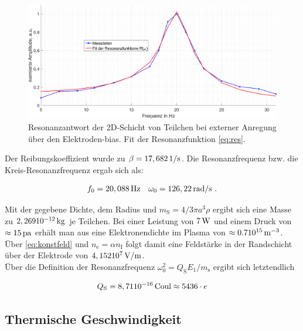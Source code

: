 \documentclass[numbers=noenddot,a4paper,notitlepage,twoside,BCOR15mm]{scrartcl}
\newcommand{\tenpo}[1]{ 10^{#1}}
\newcommand{\ix}[1]{_\text{#1}}
\begin{document}
		\begin{figure}[H]
			\centering
			\includegraphics[width=\textwidth]{figs/res_schick.png}
			\caption{Resonanzantwort der 2D-Schicht von Teilchen bei externer Anregung über den Elektroden-bias. Fit der Resonanzfunktion \autoref{eq:res}.}\label{img:freq}
		\end{figure}

	\clearpage

		Der Reibungskoeffizient wurde zu $\beta=\unit[17,682]{1/s}$.	Die Resonanzfrequenz bzw. die Kreis-Resonanzfrequenz ergab sich als:

			\begin{align}
				f\ix{0}=\unit[20,088]{Hz} \quad \omega\ix{0}=\unit[126,22]{rad/s} \,\, .\label{eq:resfreq}
			\end{align}

		Mit der gegebene Dichte, dem Radius und $m\ix{S}=4/3\pi a^3\rho$ ergibt sich eine Masse zu $\unit[2,269\tenpo{-12}]{kg}$ je Teilchen. Bei einer Leistung von $\unit[7]{W}$ und einem Druck von $\approx\unit[15]{pa}$ erhält man aus \cite{EMAUGreifswaldPlasm} eine Elektronendichte im Plasma von $\approx\unit[0.7\tenpo{15}]{m^{-3}}$. Über \autoref{eq:konstfeld} und $n\ix{e}=\alpha n\ix{I}$ folgt damit eine Feldstärke in der Randschicht über der Elektrode von $\unit[4,152\tenpo{7}]{V/m}$.\\
		Über die Definition der Resonanzfrequenz $\omega\ix{0}^2=Q\ix{S}E\ix{1}/m\ix{s}$ ergibt sich letztendlich

			\begin{align}
				Q\ix{S}=\unit[8,71\tenpo{-16}]{Coul}\approx 5436\cdot e \label{eq:lad}
			\end{align}

	\subsection{Thermische Geschwindigkeit}
\end{document}
